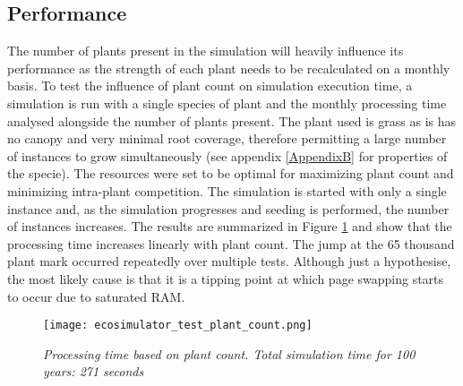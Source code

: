 \subsection{Performance} \label{subsec:ecosytem_performance}

The number of plants present in the simulation will heavily influence its performance as the strength of each plant needs to be recalculated on a monthly basis. To test the influence of plant count on simulation execution time, a simulation is run with a single species of plant and the monthly processing time analysed alongside the number of plants present. The plant used is grass as is has no canopy and very minimal root coverage, therefore permitting a large number of instances to grow simultaneously (see appendix \ref{AppendixB} for properties of the specie). The resources were set to be optimal for maximizing plant count and minimizing intra-plant competition. The simulation is started with only a single instance and, as the simulation progresses and seeding is performed, the number of instances increases. The results are summarized in Figure \ref{fig:ecosimulator_test_plant_count} and show that the processing time increases linearly with plant count. The jump at the 65 thousand plant mark occurred repeatedly over multiple tests. Although just a hypothesise, the most likely cause is that it is a tipping point at which page swapping starts to occur due to saturated RAM.\\

\begin{figure}
\center
	\texttt{[image: ecosimulator\_test\_plant\_count.png]}
	\caption{ \textit{Processing time based on plant count. Total simulation time for 100 years: 271 seconds}}	
	\label{fig:ecosimulator_test_plant_count}
\end{figure}

